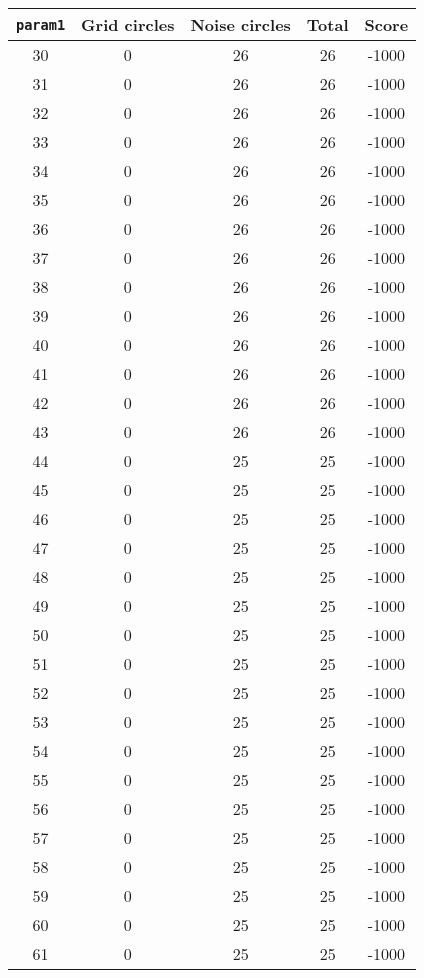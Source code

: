 \documentclass[letterpaper, 12pt]{article}
\begin{document}
\begin{longtable}{|c|c|c|c|c|}
\hline
\textbf{\texttt{param1}} & \textbf{Grid circles} & \textbf{Noise circles} & \textbf{Total} & \textbf{Score} \\
\hline
30 & 0 & 26 & 26 & -1000 \\
\hline
31 & 0 & 26 & 26 & -1000 \\
\hline
32 & 0 & 26 & 26 & -1000 \\
\hline
33 & 0 & 26 & 26 & -1000 \\
\hline
34 & 0 & 26 & 26 & -1000 \\
\hline
35 & 0 & 26 & 26 & -1000 \\
\hline
36 & 0 & 26 & 26 & -1000 \\
\hline
37 & 0 & 26 & 26 & -1000 \\
\hline
38 & 0 & 26 & 26 & -1000 \\
\hline
39 & 0 & 26 & 26 & -1000 \\
\hline
40 & 0 & 26 & 26 & -1000 \\
\hline
41 & 0 & 26 & 26 & -1000 \\
\hline
42 & 0 & 26 & 26 & -1000 \\
\hline
43 & 0 & 26 & 26 & -1000 \\
\hline
44 & 0 & 25 & 25 & -1000 \\
\hline
45 & 0 & 25 & 25 & -1000 \\
\hline
46 & 0 & 25 & 25 & -1000 \\
\hline
47 & 0 & 25 & 25 & -1000 \\
\hline
48 & 0 & 25 & 25 & -1000 \\
\hline
49 & 0 & 25 & 25 & -1000 \\
\hline
50 & 0 & 25 & 25 & -1000 \\
\hline
51 & 0 & 25 & 25 & -1000 \\
\hline
52 & 0 & 25 & 25 & -1000 \\
\hline
53 & 0 & 25 & 25 & -1000 \\
\hline
54 & 0 & 25 & 25 & -1000 \\
\hline
55 & 0 & 25 & 25 & -1000 \\
\hline
56 & 0 & 25 & 25 & -1000 \\
\hline
57 & 0 & 25 & 25 & -1000 \\
\hline
58 & 0 & 25 & 25 & -1000 \\
\hline
59 & 0 & 25 & 25 & -1000 \\
\hline
60 & 0 & 25 & 25 & -1000 \\
\hline
61 & 0 & 25 & 25 & -1000 \\

\end{longtable}
\end{document}
